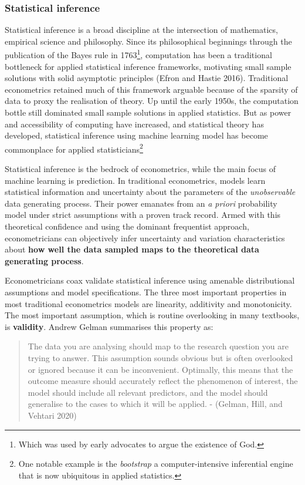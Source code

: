 \documentclass{article}
\begin{document}
\hypertarget{statistical-inference}{%
\subsubsection{Statistical inference}\label{statistical-inference}}

Statistical inference is a broad discipline at the intersection of
mathematics, empirical science and philosophy. Since its philosophical
beginnings through the publication of the Bayes rule in 1763\footnote{Which
  was used by early advocates to argue the existence of God.},
computation has been a traditional bottleneck for applied statistical
inference frameworks, motivating small sample solutions with solid
asymptotic principles (Efron and Hastie 2016). Traditional econometrics
retained much of this framework arguable because of the sparsity of data
to proxy the realisation of theory. Up until the early 1950s, the
computation bottle still dominated small sample solutions in applied
statistics. But as power and accessibility of computing have increased,
and statistical theory has developed, statistical inference using
machine learning model has become commonplace for applied
statisticians\footnote{One notable example is the \emph{bootstrap} a
  computer-intensive inferential engine that is now ubiquitous in
  applied statistics.}

Statistical inference is the bedrock of econometrics, while the main
focus of machine learning is prediction. In traditional econometrics,
models learn statistical information and uncertainty about the
parameters of the \emph{unobservable} data generating process. Their
power emanates from an \emph{a priori} probability model under strict
assumptions with a proven track record. Armed with this theoretical
confidence and using the dominant frequentist approach, econometricians
can objectively infer uncertainty and variation characteristics about
\textbf{how well the data sampled maps to the theoretical data
generating process}.

Econometricians coax validate statistical inference using amenable
distributional assumptions and model specifications. The three most
important properties in most traditional econometrics models are
linearity, additivity and monotonicity. The most important assumption,
which is routine overlooking in many textbooks, is \textbf{validity}.
Andrew Gelman summarises this property as:

\begin{quote}
The data you are analysing should map to the research question you are
trying to answer. This assumption sounds obvious but is often overlooked
or ignored because it can be inconvenient. Optimally, this means that
the outcome measure should accurately reflect the phenomenon of
interest, the model should include all relevant predictors, and the
model should generalise to the cases to which it will be applied. -
(Gelman, Hill, and Vehtari 2020)
\end{quote}
\end{document}
